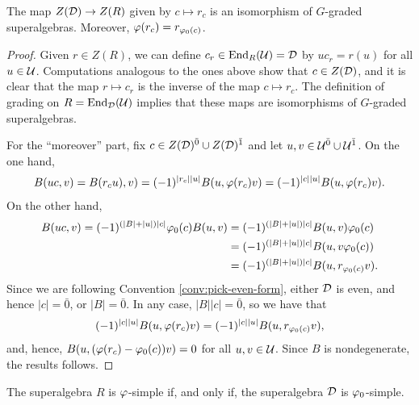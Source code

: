 \begin{prop}\label{prop:R-and-D-have-the-same-center}
    The map $Z(\mathcal{D}) \to Z(R)$ given by $c \mapsto r_c$ is an isomorphism of $G$-graded superalgebras. 
    Moreover, $\varphi (r_c) = r_{\varphi_0(c)}$.
\end{prop}

\begin{proof}
    Given $r\in Z(R)$, we can define $c_r\in \operatorname{End}_R (\mathcal U) =\mathcal{D}$ by $uc_r = r(u)$ for all $u\in \mathcal U$. 
    Computations analogous to the ones above show that $c\in Z(\mathcal{D})$, and it is clear that the map $r\mapsto c_r$ is the inverse of the map $c \mapsto r_c$. 
    The definition of grading on $R = \operatorname{End}_{\mathcal{D}} (\mathcal U)$ implies that these maps are isomorphisms of $G$-graded superalgebras.
    
    For the ``moreover'' part, fix $c\in Z(\mathcal{D})^{\bar0} \cup Z(\mathcal{D})^{\bar1}$ and let $u, v \in \mathcal U^{\bar0} \cup \mathcal U^{\bar1}$. 
    On the one hand, 
    \begin{align*}
        B(uc,v) = B(r_c u), v) = (-1)^{|r_c||u|} B(u, \varphi(r_c) v) = (-1)^{|c||u|} B(u, \varphi(r_c) v).
    \end{align*}
    On the other hand,
    \begin{align*}
        B(uc, v) = (-1)^{(|B| + |u|) |c|} \varphi_0(c) B(u, v)  &= (-1)^{(|B| + |u|) |c|} B(u, v) \varphi_0(c)\\
        &= (-1)^{(|B| + |u|) |c|} B(u, v \varphi_0(c) )\\
        &= (-1)^{(|B| + |u|) |c|} B(u, r_{\varphi_0(c)}v).
    \end{align*}
    Since we are following Convention \ref{conv:pick-even-form}, either $\mathcal{D}$ is even, and hence $|c| = \bar 0$, or
    $|B| = \bar 0$. 
    In any case, $|B||c| = \bar 0$, so we have that \[(-1)^{|c||u|} B(u, \varphi(r_c) v) = (-1)^{|c||u|} B(u, r_{\varphi_0(c)}v),\] and, hence, $B(u, (\varphi(r_c) - \varphi_0(c)) v) = 0$ for all $u, v \in \mathcal U$. 
    Since $B$ is nondegenerate, the results follows.
\end{proof}

\begin{prop}
    The superalgebra $R$ is $\varphi$-simple if, and only if, the superalgebra $\mathcal{D}$ is $\varphi_0$-simple.
\end{prop}


